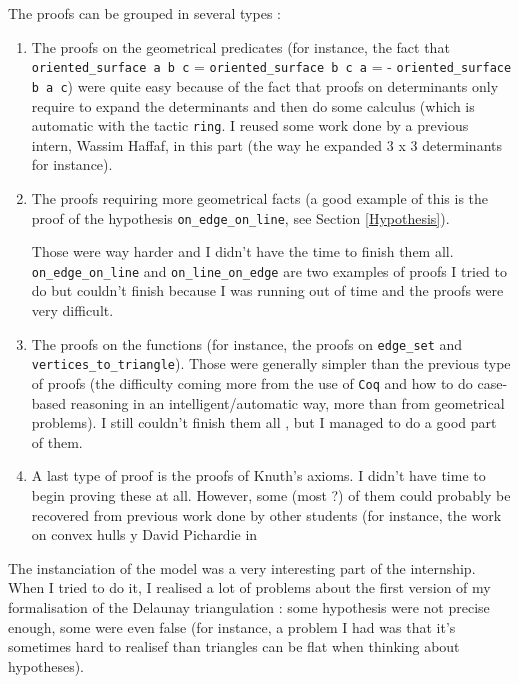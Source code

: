 \documentclass[a4paper,10pt]{article}
\begin{document}
The proofs can be grouped in several types :
\begin{enumerate}
\item The proofs on the geometrical predicates (for instance, the fact that {\tt oriented\_surface a b c} = {\tt oriented\_surface b c a} = {- \tt oriented\_surface b a c}) were quite easy because of the fact that proofs on determinants only require to expand the determinants and then do some calculus (which is automatic with the tactic {\tt ring}. I reused some work done by a previous intern, Wassim Haffaf, in this part (the way he expanded 3 x 3 determinants for instance).
\item The proofs requiring more geometrical facts (a good example of this is the proof of the hypothesis {\tt on\_edge\_on\_line}, see Section \ref{Hypothesis}).

  Those were way harder and I didn't have the time to finish them all. {\tt on\_edge\_on\_line} and {\tt on\_line\_on\_edge} are two examples of proofs I tried to do but couldn't finish because I was running out of time and the proofs were very difficult.
  \item The proofs on the functions (for instance, the proofs on {\tt edge\_set} and {\tt vertices\_to\_triangle}). Those were generally simpler than the previous type of proofs (the difficulty coming more from the use of {\tt Coq} and how to do case-based reasoning in an intelligent/automatic way, more than from geometrical problems). I still couldn't finish them all , but I managed to do a good part of them. 

    \item A last type of proof is the proofs of Knuth's axioms. I didn't have time to begin proving these at all. However, some (most ?) of them could probably be recovered from previous work done by other students (for instance, the work on convex hulls y David Pichardie in \cite{Hull}
  \end{enumerate}

  The instanciation of the model was a very interesting part of the internship. When I tried to do it, I realised a lot of problems about the first version of my formalisation of the Delaunay triangulation : some hypothesis were not precise enough, some were even false (for instance, a problem I had was that it's sometimes hard to realisef than triangles can be flat when thinking about hypotheses).


\newpage
\end{document}
